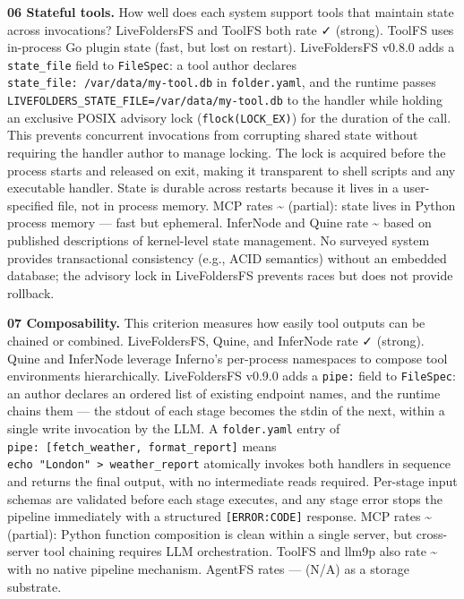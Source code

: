 \documentclass[
  11pt,
]{article}
\begin{document}
\textbf{06 Stateful tools.} How well does each system support tools that
maintain state across invocations? LiveFoldersFS and ToolFS both rate ✓
(strong). ToolFS uses in-process Go plugin state (fast, but lost on
restart). LiveFoldersFS v0.8.0 adds a \texttt{state\_file} field to
\texttt{FileSpec}: a tool author declares
\texttt{state\_file:\ /var/data/my-tool.db} in \texttt{folder.yaml}, and
the runtime passes
\texttt{LIVEFOLDERS\_STATE\_FILE=/var/data/my-tool.db} to the handler
while holding an exclusive POSIX advisory lock
(\texttt{flock(LOCK\_EX)}) for the duration of the call. This prevents
concurrent invocations from corrupting shared state without requiring
the handler author to manage locking. The lock is acquired before the
process starts and released on exit, making it transparent to shell
scripts and any executable handler. State is durable across restarts
because it lives in a user-specified file, not in process memory. MCP
rates \textasciitilde{} (partial): state lives in Python process memory
--- fast but ephemeral. InferNode and Quine rate \textasciitilde{} based
on published descriptions of kernel-level state management. No surveyed
system provides transactional consistency (e.g., ACID semantics) without
an embedded database; the advisory lock in LiveFoldersFS prevents races
but does not provide rollback.

\textbf{07 Composability.} This criterion measures how easily tool
outputs can be chained or combined. LiveFoldersFS, Quine, and InferNode
rate ✓ (strong). Quine and InferNode leverage Inferno's per-process
namespaces to compose tool environments hierarchically. LiveFoldersFS
v0.9.0 adds a \texttt{pipe:} field to \texttt{FileSpec}: an author
declares an ordered list of existing endpoint names, and the runtime
chains them --- the stdout of each stage becomes the stdin of the next,
within a single write invocation by the LLM. A \texttt{folder.yaml}
entry of \texttt{pipe:\ {[}fetch\_weather,\ format\_report{]}} means
\texttt{echo\ "London"\ \textgreater{}\ weather\_report} atomically
invokes both handlers in sequence and returns the final output, with no
intermediate reads required. Per-stage input schemas are validated
before each stage executes, and any stage error stops the pipeline
immediately with a structured \texttt{{[}ERROR:CODE{]}} response. MCP
rates \textasciitilde{} (partial): Python function composition is clean
within a single server, but cross-server tool chaining requires LLM
orchestration. ToolFS and llm9p also rate \textasciitilde{} with no
native pipeline mechanism. AgentFS rates --- (N/A) as a storage
substrate.
\end{document}
